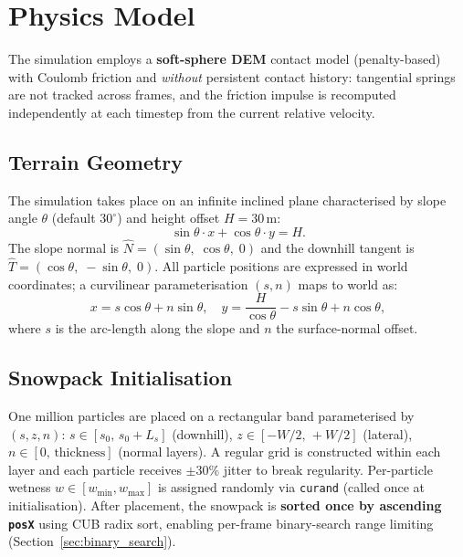 \section{Physics Model}
\label{sec:physics}

The simulation employs a \textbf{soft-sphere DEM} contact model (penalty-based)
with Coulomb friction and \emph{without} persistent contact history: tangential
springs are not tracked across frames, and the friction impulse is recomputed
independently at each timestep from the current relative velocity.

\subsection{Terrain Geometry}
\label{sec:terrain}

The simulation takes place on an infinite inclined plane characterised by slope
angle $\theta$ (default $30^{\circ}$) and height offset $H = 30$\,m:
%
\begin{equation}
  \sin\theta \cdot x + \cos\theta \cdot y = H.
  \label{eq:slope_plane}
\end{equation}
%
The slope normal is $\hat{N} = (\sin\theta,\;\cos\theta,\;0)$ and the downhill
tangent is $\hat{T} = (\cos\theta,\;-\sin\theta,\;0)$. All particle positions
are expressed in world coordinates; a curvilinear parameterisation $(s, n)$
maps to world as:
%
\begin{equation}
  x = s\cos\theta + n\sin\theta,\quad
  y = \frac{H}{\cos\theta} - s\sin\theta + n\cos\theta,
  \label{eq:curvilinear}
\end{equation}
%
where $s$ is the arc-length along the slope and $n$ the surface-normal offset.

\subsection{Snowpack Initialisation}
\label{sec:snowpack_init}

One million particles are placed on a rectangular band parameterised by $(s, z,
n)$: $s \in [s_0,\, s_0 + L_s]$ (downhill), $z \in [-W/2,\, +W/2]$ (lateral),
$n \in [0,\,\text{thickness}]$ (normal layers). A regular grid is constructed
within each layer and each particle receives $\pm30\%$ jitter to break
regularity. Per-particle wetness $w \in [w_{\min}, w_{\max}]$ is assigned
randomly via \texttt{curand} (called once at initialisation). After placement,
the snowpack is \textbf{sorted once by ascending \texttt{posX}} using CUB radix
sort, enabling per-frame binary-search range limiting
(Section~\ref{sec:binary_search}).

